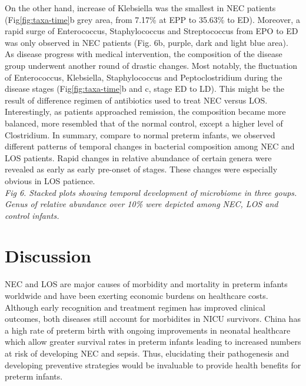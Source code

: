 \documentclass[fleqn,10pt]{wlpeerj} %
\begin{document}
    \noindent
  	On the other hand, increase of Klebsiella was the smallest  in NEC patients (Fig\ref{fig:taxa-time}b grey area, from 7.17\% at EPP to 35.63\% to ED).  Moreover, a rapid surge of Enterococcus, Staphylococcus and Streptococcus from EPO to ED was only observed in NEC patients (Fig. 6b, purple, dark and light blue area). \\

    \noindent
  	As disease progress with medical intervention, the composition of the disease group underwent another round of drastic changes.  Most notably, the fluctuation of Enterococcus, Klebsiella, Staphylococcus and Peptoclostridium during the disease stages (Fig\ref{fig:taxa-time}b and c, stage ED to LD).  This might be the result of difference regimen of antibiotics used to treat NEC versus LOS.  Interestingly, as patients approached remission, the composition became more balanced, more resembled that of the normal control, except a higher level of Clostridium.  In summary, compare to normal preterm infants, we observed different patterns of temporal changes in bacterial composition among NEC and LOS patients.  Rapid changes in relative abundance of certain genera were revealed as early as early pre-onset of stages.  These changes were especially obvious in LOS patience. \\

  \textit{Fig 6. Stacked plots showing temporal development of microbiome in three goups. Genus of relative abundance over 10\% were depicted among NEC, LOS and control infants.}


\section*{Discussion}
NEC and LOS are major causes of morbidity and mortality in preterm infants worldwide and have been exerting economic burdens on healthcare costs\citep{johnson2013cost,johnson2014economic, mowitz2018cost}. Although early recognition and treatment regimen has improved clinical outcomes, both diseases still account for morbidites in NICU survivors\citep{hintz2005neurodevelopmental, zonnenberg2019neurodevelopmental, shah2015risk}. China has a high rate of preterm birth\citep{blencowe2012national} with ongoing improvements in neonatal healthcare which allow greater survival rates in preterm infants leading to increased numbers at risk of developing NEC and sepsis. Thus, elucidating their pathogenesis and developing preventive strategies would be invaluable to provide health benefits for preterm infants. \\
\end{document}

